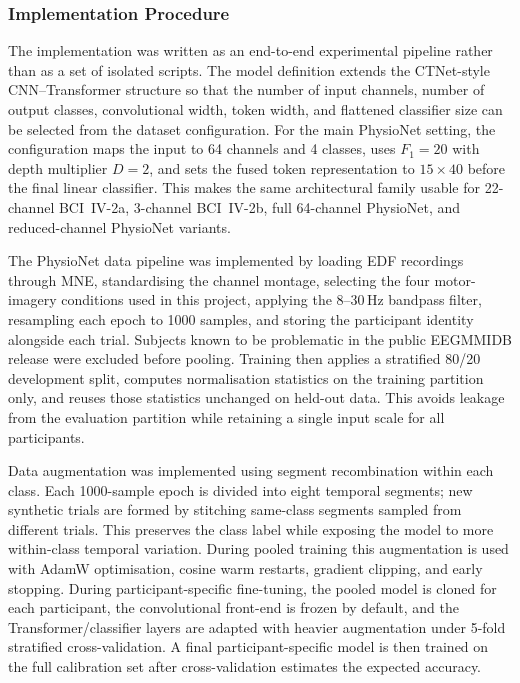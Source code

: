 \documentclass[12pt, a4paper]{article}
\begin{document}
\subsubsection{Implementation Procedure}

The implementation was written as an end-to-end experimental pipeline rather than as a set of isolated scripts. The model definition extends the CTNet-style CNN--Transformer structure so that the number of input channels, number of output classes, convolutional width, token width, and flattened classifier size can be selected from the dataset configuration. For the main PhysioNet setting, the configuration maps the input to 64 channels and 4 classes, uses $F_1=20$ with depth multiplier $D=2$, and sets the fused token representation to $15 \times 40$ before the final linear classifier. This makes the same architectural family usable for 22-channel BCI~IV-2a, 3-channel BCI~IV-2b, full 64-channel PhysioNet, and reduced-channel PhysioNet variants.

The PhysioNet data pipeline was implemented by loading EDF recordings through MNE, standardising the channel montage, selecting the four motor-imagery conditions used in this project, applying the 8--30\,Hz bandpass filter, resampling each epoch to 1000 samples, and storing the participant identity alongside each trial. Subjects known to be problematic in the public EEGMMIDB release were excluded before pooling. Training then applies a stratified 80/20 development split, computes normalisation statistics on the training partition only, and reuses those statistics unchanged on held-out data. This avoids leakage from the evaluation partition while retaining a single input scale for all participants.

Data augmentation was implemented using segment recombination within each class. Each 1000-sample epoch is divided into eight temporal segments; new synthetic trials are formed by stitching same-class segments sampled from different trials. This preserves the class label while exposing the model to more within-class temporal variation. During pooled training this augmentation is used with AdamW optimisation, cosine warm restarts, gradient clipping, and early stopping. During participant-specific fine-tuning, the pooled model is cloned for each participant, the convolutional front-end is frozen by default, and the Transformer/classifier layers are adapted with heavier augmentation under 5-fold stratified cross-validation. A final participant-specific model is then trained on the full calibration set after cross-validation estimates the expected accuracy.
\end{document}
